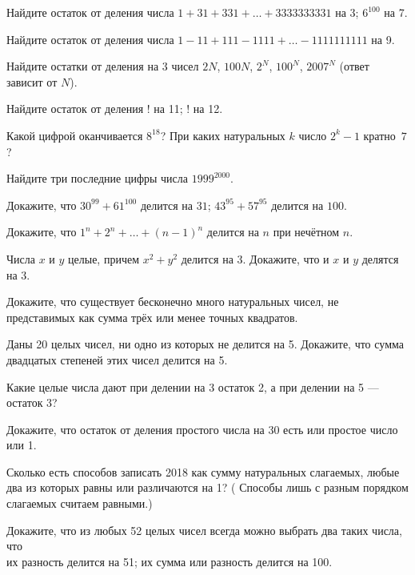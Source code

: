 \documentclass[12pt,a4paper]{article}
\begin{document}
Найдите остаток от деления
 числа $1+31+331+\ldots+3333333331$ на $3$;
 $6^{100}$ на 7.

Найдите остаток от деления числа  $1-11+111-1111+\ldots-1111111111$ на 9.

Найдите остатки от деления на 3 чисел $2N$, $100N$, $2^N$, $100^N$, $2007^N$ (ответ зависит от $N$).

Найдите остаток от деления  ! на 11; ! на 12.


Какой цифрой оканчивается %
$8^{18}$?
При каких натуральных $k$ число $2^k-1$ кратно~$7$?

Найдите три последние цифры числа $1999^{2000}$.


Докажите, что
 $30^{99}+61^{100}$ делится на $31$;
 $43^{95}+57^{95}$ делится на $100$.

Докажите, что $1^n+2^n+\ldots+(n-1)^n$ делится на $n$ при нечётном $n$.


Числа $x$ и $y$ целые, причем $x^2+y^2$ делится на 3.
Докажите, что и $x$ и $y$ делятся на 3.

Докажите, что существует бесконечно много натуральных чисел, не представимых как сумма трёх или менее точных квадратов.

Даны 20 целых чисел, ни одно из которых не делится на 5. Докажите, что
сумма двадцатых степеней этих чисел делится на 5.

Какие целые числа дают при делении на 3 остаток 2,
а при делении на 5 --- остаток 3?

Докажите, что остаток от деления простого  числа на 30 есть или простое
число или 1.

Сколько есть способов записать 2018 как сумму
натуральных слагаемых, любые два из которых равны или
различаются на 1?
(%
Способы лишь с разным
порядком слагаемых считаем равными.)

Докажите, что из любых 52 целых чисел всегда можно выбрать два
таких числа, что\\
их разность делится на 51;
их сумма или разность делится на 100.
\end{document}

